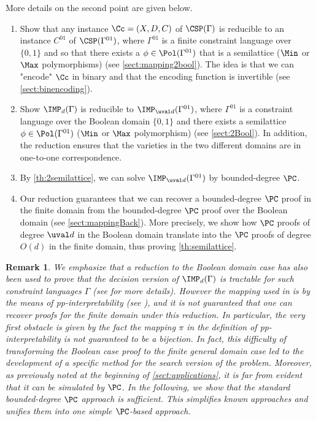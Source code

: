 \documentclass[11pt]{article}
\newtheorem{remark}[theorem]{Remark}
\begin{document}
More details on the second point are given below.

\begin{enumerate}
    \item Show that any instance $\Cc = (X,D,C)$ of $\CSP(\Gamma)$ is reducible to an instance $C^{01}$ of $\CSP(\Gamma^{01})$, where $\Gamma^{01}$ is a finite constraint language over $\{0,1\}$ and so that there exists a $\phi \in \Pol(\Gamma^{01})$ that is a semilattice ($\Min$ or $\Max$ polymorphisms) (see \cref{sect:mapping2bool}). The idea is that we can "encode" $\Cc$ in binary and that the encoding function is invertible (see \cref{sect:binencoding}).
    \item Show $\IMP_d(\Gamma)$ is reducible to $\IMP_{\uval d}(\Gamma^{01})$, where $\Gamma^{01}$ is a constraint language over the Boolean domain $\{0,1\}$ and there exists a semilattice $\phi \in \Pol(\Gamma^{01})$ ($\Min$ or $\Max$ polymorphism) (see \cref{sect:2Bool}). In addition, the reduction ensures that the varieties in the two different domains are in one-to-one correspondence.
    \item By \cref{th:2semilattice}, we can solve $\IMP_{\uval d}(\Gamma^{01})$ by bounded-degree $\PC$.
    \item Our reduction guarantees that we can recover a bounded-degree $\PC$ proof in the finite domain from the bounded-degree $\PC$ proof over the Boolean domain (see \cref{sect:mappingBack}). More precisely, we show how $\PC$ proofs of degree $\uval d$ in the Boolean domain translate into the $\PC$ proofs of degree $O(d)$ in the finite domain, thus proving \cref{th:semilattice}.
\end{enumerate}

\begin{remark}\label{rm:semilattice}
We emphasize that a reduction to the Boolean domain case has also been used to prove that the decision version of $\IMP_d(\Gamma)$ is tractable for such constraint languages $\Gamma$ (see \cite[Th. 5.10]{BulatovRSTOC22} for more details). However the mapping used in \cite{BulatovRSTOC22} is by the means of pp-interpretability (see \cite{DonaPapert1964}), and it is not guaranteed that one can recover proofs for the finite domain under this reduction. In particular, the very first obstacle is given by the fact the mapping $\pi$ in the definition of pp-interpretability \cite[Def.~3.12]{BulatovRSTOC22} is not guaranteed to be a bijection. In fact, this difficulty of transforming the Boolean case proof to the finite general domain case led to the development of a specific method \cite[Th.~6.5]{BulatovRSTOC22} for the search version of the problem. Moreover, as previously noted at the beginning of \cref{sect:applications}, it is far from evident that it can be simulated by $\PC$. In the following, we show that the standard bounded-degree $\PC$ approach is sufficient. This simplifies known approaches and unifies them into one simple $\PC$-based approach.
\end{remark}
\end{document}

